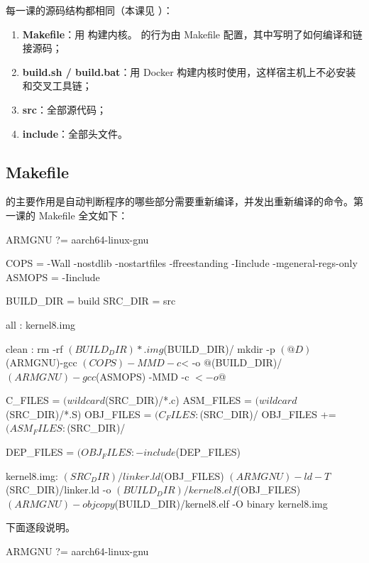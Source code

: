 每一课的源码结构都相同（本课见 ）：

\begin{enumerate}
  \item \textbf{Makefile}：用  构建内核。 的行为由 Makefile 配置，其中写明了如何编译和链接源码；
  \item \textbf{build.sh / build.bat}：用 Docker 构建内核时使用，这样宿主机上不必安装  和交叉工具链；
  \item \textbf{src}：全部源代码；
  \item \textbf{include}：全部头文件。
\end{enumerate}

\subsection{Makefile}

 的主要作用是自动判断程序的哪些部分需要重新编译，并发出重新编译的命令。第一课的 Makefile 全文如下：

\begin{makecode}
ARMGNU ?= aarch64-linux-gnu

COPS = -Wall -nostdlib -nostartfiles -ffreestanding -Iinclude -mgeneral-regs-only
ASMOPS = -Iinclude

BUILD_DIR = build
SRC_DIR = src

all : kernel8.img

clean :
	rm -rf $(BUILD_DIR) *.img

$(BUILD_DIR)/%
	mkdir -p $(@D)
	$(ARMGNU)-gcc $(COPS) -MMD -c $< -o $@

$(BUILD_DIR)/%
	$(ARMGNU)-gcc $(ASMOPS) -MMD -c $< -o $@

C_FILES = $(wildcard $(SRC_DIR)/*.c)
ASM_FILES = $(wildcard $(SRC_DIR)/*.S)
OBJ_FILES = $(C_FILES:$(SRC_DIR)/%
OBJ_FILES += $(ASM_FILES:$(SRC_DIR)/%

DEP_FILES = $(OBJ_FILES:%
-include $(DEP_FILES)

kernel8.img: $(SRC_DIR)/linker.ld $(OBJ_FILES)
	$(ARMGNU)-ld -T $(SRC_DIR)/linker.ld -o $(BUILD_DIR)/kernel8.elf  $(OBJ_FILES)
	$(ARMGNU)-objcopy $(BUILD_DIR)/kernel8.elf -O binary kernel8.img
\end{makecode}

下面逐段说明。

\begin{makecode}
ARMGNU ?= aarch64-linux-gnu
\end{makecode}

